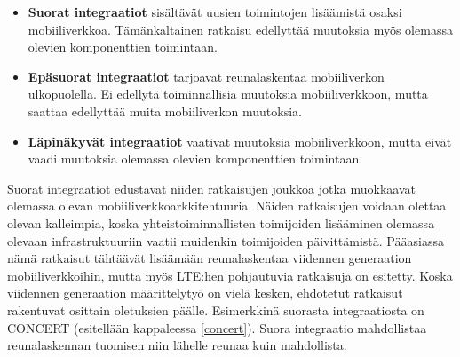 

\begin{itemize}
\item \textbf{Suorat integraatiot} sisältävät uusien toimintojen lisäämistä osaksi mobiiliverkkoa. Tämänkaltainen ratkaisu edellyttää muutoksia myös olemassa olevien komponenttien toimintaan. 
\item \textbf{Epäsuorat integraatiot} tarjoavat reunalaskentaa mobiiliverkon ulkopuolella. Ei edellytä toiminnallisia muutoksia mobiiliverkkoon, mutta saattaa edellyttää muita mobiiliverkon muutoksia.
\item \textbf{Läpinäkyvät integraatiot} vaativat muutoksia mobiiliverkkoon, mutta eivät vaadi muutoksia olemassa olevien komponenttien toimintaan.
\end{itemize}

Suorat integraatiot edustavat niiden ratkaisujen joukkoa jotka muokkaavat olemassa olevan mobiiliverkkoarkkitehtuuria.
Näiden ratkaisujen voidaan olettaa olevan kalleimpia, koska yhteistoiminnallisten toimijoiden lisääminen olemassa olevaan infrastruktuuriin vaatii muidenkin toimijoiden päivittämistä.
Pääasiassa nämä ratkaisut tähtäävät lisäämään reunalaskentaa viidennen generaation mobiiliverkkoihin, mutta myös LTE:hen pohjautuvia ratkaisuja on esitetty.
Koska viidennen generaation määrittelytyö on vielä kesken, ehdotetut ratkaisut rakentuvat osittain oletuksien päälle.
Esimerkkinä suorasta integraatiosta on CONCERT (esitellään kappaleessa \ref{concert}). Suora integraatio mahdollistaa reunalaskennan tuomisen niin lähelle reunaa kuin mahdollista.

